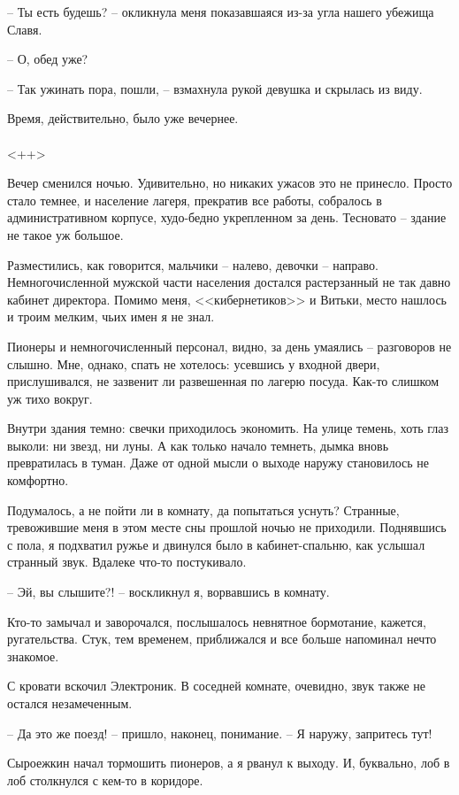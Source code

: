 \documentclass[a4paper]{book}
\begin{document}
-- Ты есть будешь? -- окликнула меня показавшаяся из-за угла нашего убежища Славя.

-- О, обед уже? 

-- Так ужинать пора, пошли, -- взмахнула рукой девушка и скрылась из виду. 

Время, действительно, было уже вечернее. 

\paragraph{}<++>

Вечер сменился ночью. Удивительно, но никаких ужасов это не принесло. Просто стало темнее, и население лагеря, прекратив все работы, собралось в административном корпусе, худо-бедно укрепленном за день. Тесновато -- здание не такое уж большое. 

Разместились, как говорится, мальчики -- налево, девочки -- направо. Немногочисленной мужской части населения достался растерзанный не так давно кабинет директора. Помимо меня, <<кибернетиков>> и Витьки, место нашлось и троим мелким, чьих имен я не знал. 

Пионеры и немногочисленный персонал, видно, за день умаялись -- разговоров не слышно. Мне, однако, спать не хотелось: усевшись у входной двери, прислушивался, не зазвенит ли развешенная по лагерю посуда. Как-то слишком уж тихо вокруг. 

Внутри здания темно: свечки приходилось экономить. На улице темень, хоть глаз выколи: ни звезд, ни луны. А как только начало темнеть, дымка вновь превратилась в туман. Даже от одной мысли о выходе наружу становилось не комфортно.

Подумалось, а не пойти ли в комнату, да попытаться уснуть? Странные, тревожившие меня в этом месте сны прошлой ночью не приходили. Поднявшись с пола, я подхватил ружье и двинулся было в кабинет-спальню, как услышал странный звук. Вдалеке что-то постукивало. 

-- Эй, вы слышите?! -- воскликнул я, ворвавшись в комнату.

Кто-то замычал и заворочался, послышалось невнятное бормотание, кажется, ругательства. Стук, тем временем, приближался и все больше напоминал нечто знакомое.

С кровати вскочил Электроник. В соседней комнате, очевидно, звук также не остался незамеченным. 

-- Да это же поезд! -- пришло, наконец, понимание. -- Я наружу, запритесь тут!

Сыроежкин начал тормошить пионеров, а я рванул к выходу. И, буквально, лоб в лоб столкнулся с кем-то в коридоре. 
\end{document}
